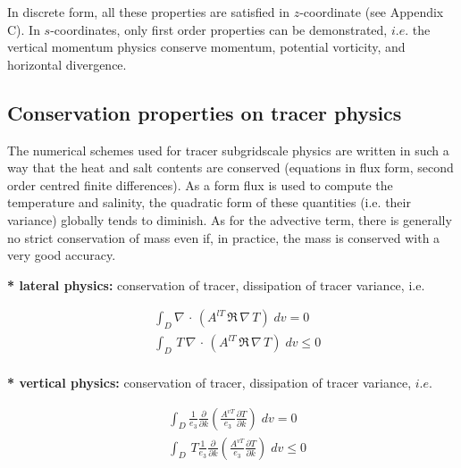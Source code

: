\documentclass[../tex_main/NEMO_manual]{subfiles}
\begin{document}
In discrete form, all these properties are satisfied in $z$-coordinate (see Appendix C).
In $s$-coordinates, only first order properties can be demonstrated,
$i.e.$ the vertical momentum physics conserve momentum, potential vorticity, and horizontal divergence.

\subsection{Conservation properties on tracer physics}
\label{subsec:Invariant_tra_physics}

The numerical schemes used for tracer subgridscale physics are written in such a way that
the heat and salt contents are conserved (equations in flux form, second order centred finite differences).
As a form flux is used to compute the temperature and salinity,
the quadratic form of these quantities (i.e. their variance) globally tends to diminish.
As for the advective term, there is generally no strict conservation of mass even if,
in practice, the mass is conserved with a very good accuracy. 

\textbf{* lateral physics: }conservation of tracer, dissipation of tracer 
variance, i.e.

\begin{equation} \label{eq:traldf_t_t2}
\begin{aligned}
&\int_D \nabla\, \cdot\, \left( A^{lT} \,\Re \,\nabla \,T \right)\;dv = 0 \\ 
&\int_D \,T\, \nabla\, \cdot\, \left( A^{lT} \,\Re \,\nabla \,T \right)\;dv \leq 0 \\ 
\end{aligned}
\end{equation}

\textbf{* vertical physics: }conservation of tracer, dissipation of tracer variance, $i.e.$

\begin{equation} \label{eq:trazdf_t_t2}
\begin{aligned}
& \int_D \frac{1}{e_3 } \frac{\partial }{\partial k}\left( \frac{A^{vT}}{e_3 }  \frac{\partial T}{\partial k}  \right)\;dv = 0 \\ 
& \int_D \,T \frac{1}{e_3 } \frac{\partial }{\partial k}\left( \frac{A^{vT}}{e_3 }  \frac{\partial T}{\partial k}  \right)\;dv \leq 0 \\ 
\end{aligned}
\end{equation}
\end{document}
